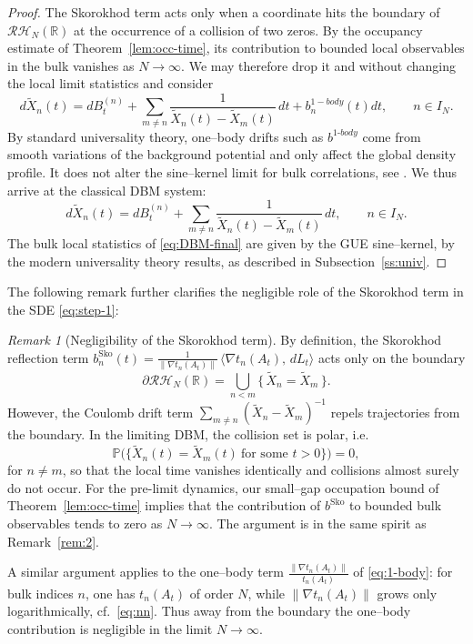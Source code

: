 \documentclass[12pt,reqno]{amsart}
\theoremstyle{plain}
\theoremstyle{definition}
\theoremstyle{remark}
\newtheorem{rem}{Remark}[section]       %
\begin{document}
\begin{proof}
The Skorokhod term acts only when a coordinate hits the
boundary of $\mathcal{RH}_N(\mathbb{R})$ at the occurrence of a collision of two zeros. By the occupancy estimate of Theorem~\ref{lem:occ-time}, its contribution to bounded local
observables in the bulk vanishes as $N\to\infty$. We may therefore drop it and
without changing the local limit statistics and consider
\begin{equation}\label{eq:step-5}
d\widetilde X_n(t)
= dB^{(n)}_t + \sum_{m\neq n}\frac{1}{\widetilde X_n(t)-\widetilde X_m(t)}\,dt+b^{1-body}_n(t) dt ,
\qquad n\in I_N .
\end{equation}
By standard universality theory, one–body drifts such as $b^{1\text{-}body}$ come from smooth variations of the
background potential and only affect the global density profile. It does not alter the sine–kernel limit for bulk correlations, see \cite{AGZ,ErdosSchleinYau2011}.
We thus arrive at the classical DBM system:
\begin{equation}\label{eq:DBM-final}
d\widetilde X_n(t)
= dB^{(n)}_t + \sum_{m\neq n}\frac{1}{\widetilde X_n(t)-\widetilde X_m(t)}\,dt ,
\qquad n\in I_N .
\end{equation}
The bulk local statistics of \eqref{eq:DBM-final} are given by the GUE sine–kernel, by the modern universality theory results, as described in Subsection~\ref{ss:univ}.
\end{proof}

The following remark further clarifies the negligible role of the Skorokhod term in the SDE \eqref{eq:step-1}:

\begin{rem}[Negligibility of the Skorokhod term]
By definition, the Skorokhod reflection term
\(b^{\mathrm{Sko}}_n(t)=\tfrac{1}{\|\nabla t_n(A_t)\|}\,\langle \nabla t_n(A_t),\,dL_t\rangle\)
acts only on the boundary
\begin{equation}
\partial\mathcal{RH}_N(\mathbb{R})
= \bigcup_{n<m}\{\,\widetilde X_n=\widetilde X_m\,\}.
\end{equation}
However, the Coulomb drift term \(\sum_{m\neq n}(\widetilde X_n-\widetilde X_m)^{-1}\) repels trajectories from the boundary. In the limiting DBM, the collision set is polar, i.e. 
\begin{equation}
\mathbb{P}\big(\{\widetilde X_n(t)=\widetilde X_m(t)\ \text{for some } t>0\}\big)=0,
\end{equation}
for $n\ne m$, so that the local time vanishes identically and collisions almost surely do not occur. For the pre-limit dynamics, our small–gap occupation bound of Theorem~\ref{lem:occ-time} implies that the contribution of \(b^{\mathrm{Sko}}\) to bounded bulk observables tends to zero as \(N\to\infty\). The argument is in the same spirit as Remark~\ref{rem:2}. 

A similar argument applies to the one–body term
\(\tfrac{\|\nabla t_n(A_t)\|}{t_n(A_t)}\) of \eqref{eq:1-body}: for bulk indices $n$, one has $t_n(A_t)$ of order $N$, while $\|\nabla t_n(A_t)\|$ grows only logarithmically, cf.~\eqref{eq:nn}. Thus away from the boundary the one–body contribution is negligible in the limit $N\to\infty$.
\end{rem}
\end{document}
